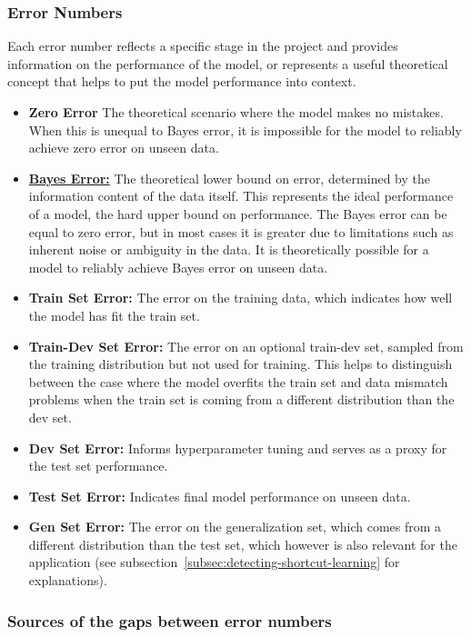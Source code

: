 \documentclass[12pt,openany, draft]{book}
\begin{document}
\subsubsection{Error Numbers}
Each error number reflects a specific stage in the project and provides information on the performance of the model, or represents a useful theoretical concept that helps to put the model performance into context.
\begin{itemize}
    \item \textbf{Zero Error} The theoretical scenario where the model makes no mistakes. When this is unequal to Bayes error, it is impossible for the model to reliably achieve zero error on unseen data.
    \item \textbf{\hyperref[subsec:Bayes_error]{Bayes Error:}} The theoretical lower bound on error, determined by the information content of the data itself. This represents the ideal performance of a model, the hard upper bound on performance. The Bayes error can be equal to zero error, but in most cases it is greater due to limitations such as inherent noise or ambiguity in the data. It is theoretically possible for a model to reliably achieve Bayes error on unseen data.
    \item \textbf{Train Set Error:} The error on the training data, which indicates how well the model has fit the train set.
    \item \textbf{Train-Dev Set Error:} The error on an optional train-dev set, sampled from the training distribution but not used for training. This helps to distinguish between the case where the model overfits the train set and data mismatch problems when the train set is coming from a different distribution than the dev set.
    \item \textbf{Dev Set Error:} Informs hyperparameter tuning and serves as a proxy for the test set performance.
    \item \textbf{Test Set Error:} Indicates final model performance on unseen data.
    \item \textbf{Gen Set Error:} The error on the generalization set, which comes from a different distribution than the test set, which however is also relevant for the application (see subsection~\ref{subsec:detecting-shortcut-learning} for explanations).
\end{itemize}

\subsubsection{Sources of the gaps between error numbers}
\end{document}
